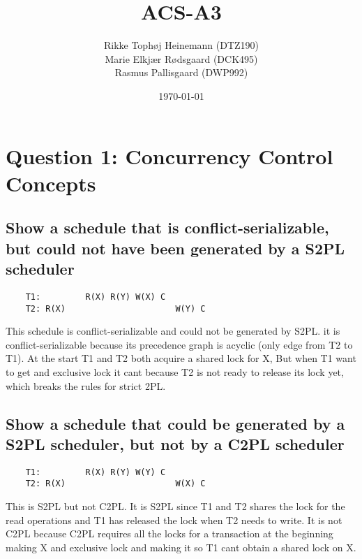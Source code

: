 \documentclass{article}
\title{ACS-A3}
\author{Rikke Tophøj Heinemann (DTZ190) \\ Marie Elkjær Rødsgaard (DCK495) \\ Rasmus Pallisgaard (DWP992)}
\date{\today}
\begin{document}
\maketitle

\section{Question 1: Concurrency Control Concepts}
\subsection{Show a schedule that is conflict-serializable, but could not have been generated by a S2PL scheduler}
\begin{verbatim}
    T1:         R(X) R(Y) W(X) C
    T2: R(X)                      W(Y) C
\end{verbatim}
This schedule is conflict-serializable and could not be generated by S2PL. it is conflict-serializable because its precedence graph is acyclic (only edge from T2 to T1). At the start T1 and T2 both acquire a shared lock for X, But when T1 want to get and exclusive lock it cant because T2 is not ready to release its lock yet, which breaks the rules for strict 2PL. 


\subsection{Show a schedule that could be generated by a S2PL scheduler, but not by a C2PL scheduler}

\begin{verbatim}
    T1:         R(X) R(Y) W(Y) C
    T2: R(X)                      W(X) C
\end{verbatim}
This is S2PL but not C2PL. It is S2PL since T1 and T2 shares the lock for the read operations and T1 has released the lock when T2 needs to write. It is not C2PL because C2PL requires all the locks for a transaction at the beginning making X and exclusive lock and making it so T1 cant obtain a shared lock on X.
\end{document}

